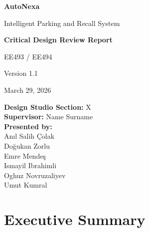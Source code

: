 \documentclass[12pt,a4paper]{report}
\newcommand{\projectname}{AutoNexa}
\newcommand{\reporttitle}{Critical Design Review Report}
\newcommand{\courseinfo}{EE493 / EE494}
\newcommand{\versioninfo}{Version 1.1}
\newcommand{\reportdate}{March 29, 2026}
\begin{document}
\begin{titlepage}
    \centering
    \vspace*{2cm}

    {\Huge \textbf{\projectname} \par}
    \vspace{0.5cm}
    {\LARGE Intelligent Parking and Recall System \par}
    \vspace{1.5cm}

    {\Huge \textbf{\reporttitle} \par}
    \vspace{1cm}

    {\Large \courseinfo \par}
    \vspace{0.5cm}
    {\Large \versioninfo \par}
    \vspace{0.5cm}
    {\Large \reportdate \par}

    \vfill

    \begin{flushleft}
    \textbf{Design Studio Section:} X \\[0.4cm]
    \textbf{Supervisor:} Name Surname \\[0.4cm]
    \textbf{Presented by:} \\[0.2cm]
    Anıl Salih Çolak \\
    Doğukan Zorlu \\
    Emre Mendeş \\
    Ismayil Ibrahimli \\
    Oghuz Novruzaliyev \\
    Umut Kumral \\
    \end{flushleft}

    \vfill
\end{titlepage}

\tableofcontents
\clearpage
\listoffigures
\clearpage
\listoftables
\clearpage
{}

\chapter*{Executive Summary}
\end{document}

